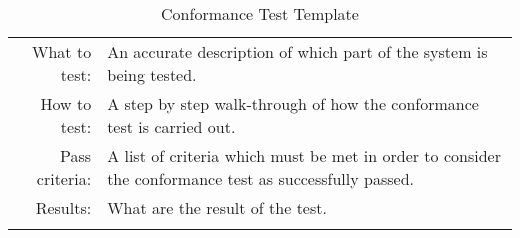 \begin{table}[H]
  \begin{tabular}{r | p{8cm}}
    \noalign{\smallskip}\hline\noalign{\smallskip}
    
    What to test:  & An accurate description of which part of the system is being
    tested. \\

    \noalign{\smallskip}\hline\noalign{\smallskip}

    How to test:   & A step by step walk-through of how the conformance test is
    carried out. \\

    \noalign{\smallskip}\hline\noalign{\smallskip}

    Pass criteria: & A list of criteria which must be met in order to consider
    the conformance test as successfully passed. \\

    \noalign{\smallskip}\hline\noalign{\smallskip}
    
    Results: &  What are the result of the test. \\
   \noalign{\smallskip}\hline\noalign{\smallskip}
  
  
  
  \end{tabular}
  \caption{Conformance Test Template}
  \label{testing:fitness:pipeline_test}
\end{table}
